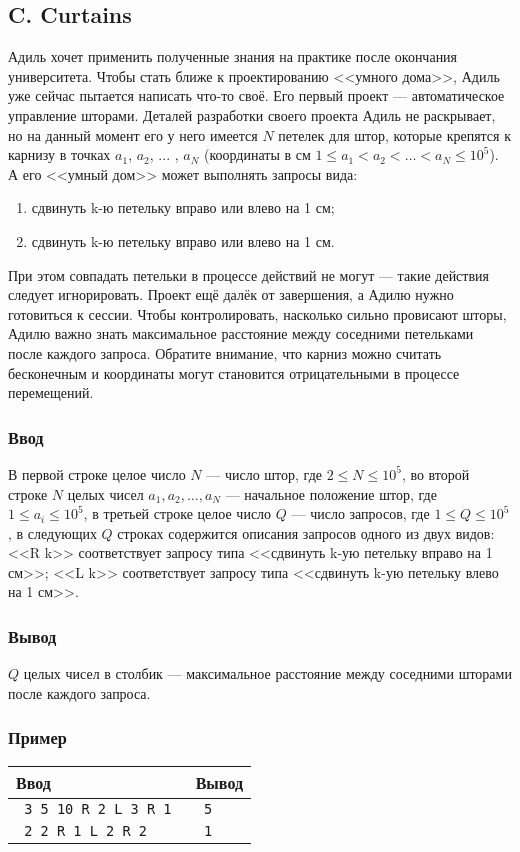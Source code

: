 \documentclass[10pt, a4paper]{article}
\newcommand{\informat}[1]
{
	\subsubsection*{Ввод} #1
}
\newcommand{\outformat}[1]
{
	\subsubsection*{Вывод} #1
}
\newcommand{\examplee}[4]
{
	\subsubsection*{Пример}
	\noindent
	\begin{center}
	\begin{tabularx}{\linewidth}{|X|X|}
	\hline
	Ввод 	& Вывод  	\\
	\hline
	{\tt #1} & {\tt #2}	\\
	\hline
	{\tt #3} & {\tt #4}	\\
	\hline
	\end{tabularx}
	\end{center}
}
\begin{document}
\subsection*{C. Curtains}

Адиль хочет применить полученные знания на практике после окончания университета. Чтобы стать ближе к проектированию <<умного дома>>, Адиль уже сейчас пытается написать что-то своё. Его первый проект --- автоматическое управление шторами. Деталей разработки своего проекта Адиль не раскрывает, но на данный момент его у него имеется $N$ петелек для штор, которые крепятся к карнизу в точках $a_1$, $a_2$, ... , $a_N$ (координаты в см \mbox{$1 \le a_1 < a_2 < \dots < a_N \le 10^5$}). А его <<умный дом>> может выполнять запросы вида:
\begin{enumerate}
\item сдвинуть k-ю петельку вправо или влево на 1 см;
\item сдвинуть k-ю петельку вправо или влево на 1 см.
\end{enumerate}
При этом совпадать петельки в процессе действий не могут --- такие действия следует игнорировать. Проект ещё далёк от завершения, а Адилю нужно готовиться к сессии. Чтобы контролировать, насколько сильно провисают шторы, Адилю важно знать максимальное расстояние между соседними петельками после каждого запроса. Обратите внимание, что карниз можно считать бесконечным и координаты могут становится отрицательными в процессе перемещений.

\informat{В первой строке целое число $N$ --- число штор, где $2 \le N \le 10^5$, \newline
во второй строке $N$ целых чисел $a_1, a_2, \dots, a_N$ --- начальное положение штор, где $1 \le a_i \le 10^5$, \newline
в третьей строке целое число $Q$ --- число запросов, где $1 \le Q \le 10^5$, \newline
в следующих $Q$ строках содержится описания запросов одного из двух видов: \newline
<<R k>> соответствует запросу типа <<сдвинуть k-ую петельку вправо на 1 см>>; \newline
<<L k>> соответствует запросу типа <<сдвинуть k-ую петельку влево на 1 см>>.}

\outformat{$Q$ целых чисел в столбик --- максимальное расстояние между соседними шторами после каждого запроса.}

\examplee{
3 \newline
1 5 10 \newline
3 \newline
R 2 \newline
L 3 \newline
R 1
}
{
5 \newline 5 \newline 4
}
{
2 \newline
1 2 \newline 
3 \newline
R 1 \newline
L 2 \newline
R 2 \newline
}{
1 \newline 1 \newline 2
}
\end{document}
